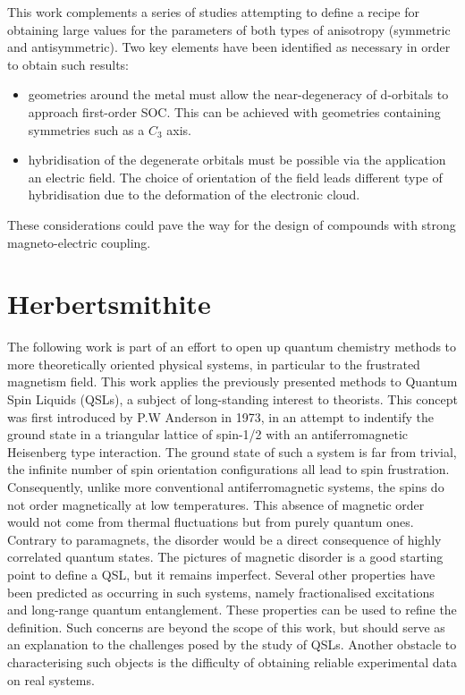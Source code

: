\documentclass[12pt,a4paper]{report}
\numberwithin{equation}{section}
\begin{document}
\par This work complements a series of studies attempting to define a recipe for obtaining large values for the parameters of both types of anisotropy (symmetric and antisymmetric).
Two key elements have been identified as necessary in order to obtain such results:
\begin{itemize}
    \item[(i)] geometries around the metal must allow the near-degeneracy of d-orbitals to approach first-order SOC. This can be achieved with geometries containing symmetries such as a $C_3$ axis.
    \item[(ii)] hybridisation of the degenerate orbitals must be possible via the application an electric field. The choice of orientation of the field leads different type of hybridisation due to the deformation of the electronic cloud. 
\end{itemize}
These considerations could pave the way for the design of compounds with strong magneto-electric coupling.


\chapter{Herbertsmithite}\label{chap:Herbertsmithite}

The following work is part of an effort to open up quantum chemistry methods to more theoretically oriented physical systems, in particular to the frustrated magnetism field.
This work applies the previously presented methods to Quantum Spin Liquids (QSLs), a subject of long-standing interest to theorists.
This concept was first introduced by P.W Anderson\cite{anderson_resonating_1973} in 1973, in an attempt to indentify the ground state in a triangular lattice of spin-1/2 with an antiferromagnetic Heisenberg type interaction.
The ground state of such a system is far from trivial, the infinite number of spin orientation configurations all lead to spin frustration. 
Consequently, unlike more conventional antiferromagnetic systems, the spins do not order magnetically at low temperatures.
This absence of magnetic order would not come from thermal fluctuations but from purely quantum ones. 
Contrary to paramagnets, the disorder would be a direct consequence of highly correlated quantum states.
The pictures of magnetic disorder is a good starting point to define a QSL, but it remains imperfect.
Several other properties have been predicted as occurring in such systems, namely fractionalised excitations and long-range quantum entanglement. 
These properties can be used to refine the definition. 
Such concerns are beyond the scope of this work, but should serve as an explanation to the challenges posed by the study of QSLs.
Another obstacle to characterising such objects is the difficulty of obtaining reliable experimental data on real systems.
\end{document}
